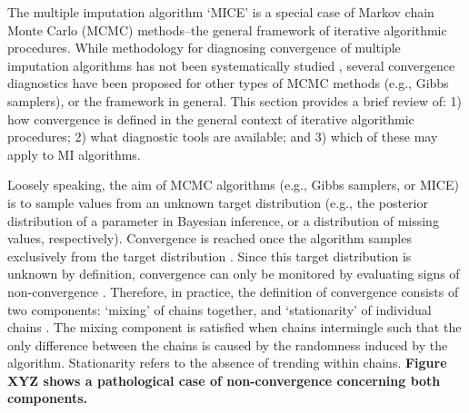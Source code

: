 \documentclass[article]{jss}
\begin{document}
The multiple imputation algorithm `MICE' is a special case of Markov chain Monte Carlo (MCMC) methods--the general framework of iterative algorithmic procedures. While methodology for diagnosing convergence of multiple imputation algorithms has not been systematically studied \citep{buur18}, several convergence diagnostics have been proposed for other types of MCMC methods (e.g., Gibbs samplers), or the framework in general.
This section provides a brief review of: 1) how convergence is defined in the general context of iterative algorithmic procedures; 2) what diagnostic tools are available; and 3) which of these may apply to MI algorithms. 

Loosely speaking, the aim of MCMC algorithms (e.g., Gibbs samplers, or MICE) is to sample values from an unknown target distribution (e.g., the posterior distribution of a parameter in Bayesian inference, or a distribution of missing values, respectively). Convergence is reached once the algorithm samples exclusively from the target distribution \citep{cowl96}. Since this target distribution is unknown by definition, convergence can only be monitored by evaluating signs of non-convergence \citep{hoff09}. Therefore, in practice, the definition of convergence consists of two components: `mixing' of chains together, and `stationarity' of individual chains \citep[p.~284]{gelm13}. The mixing component is satisfied when chains intermingle such that the only difference between the chains is caused by the randomness induced by the algorithm. Stationarity refers to the absence of trending within chains. \textbf{Figure XYZ shows a pathological case of non-convergence concerning both components.}  
\end{document}
